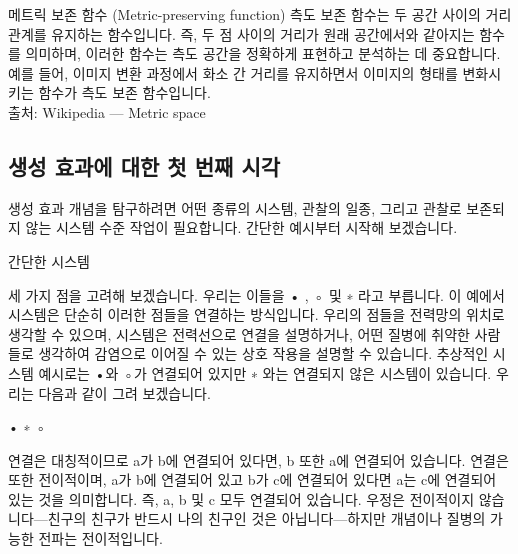 \documentclass[11pt, a4paper, twoside, openany]{book}
\begin{document}
\begin{deepresearch}{메트릭 보존 함수 (Metric-preserving function)}
측도 보존 함수는 두 공간 사이의 거리 관계를 유지하는 함수입니다.  즉, 두 점 사이의 거리가 원래 공간에서와 같아지는 함수를 의미하며, 이러한 함수는 측도 공간을 정확하게 표현하고 분석하는 데 중요합니다. 예를 들어, 이미지 변환 과정에서 화소 간 거리를 유지하면서 이미지의 형태를 변화시키는 함수가 측도 보존 함수입니다.
\\[4pt]{\footnotesize\color{ctgray} 출처: Wikipedia — Metric space}
\end{deepresearch}


\subsection{생성 효과에 대한 첫 번째 시각}
\label{sec:1-1-1}

생성 효과 개념을 탐구하려면 어떤 종류의 시스템, 관찰의 일종, 그리고 관찰로 보존되지 않는 시스템 수준 작업이 필요합니다. 간단한 예시부터 시작해 보겠습니다.

\par\medskip
간단한 시스템

\par\medskip
세 가지 점을 고려해 보겠습니다. 우리는 이들을 • , ◦ 및 ∗ 라고 부릅니다. 이 예에서 시스템은 단순히 이러한 점들을 연결하는 방식입니다. 우리의 점들을 전력망의 위치로 생각할 수 있으며, 시스템은 전력선으로 연결을 설명하거나, 어떤 질병에 취약한 사람들로 생각하여 감염으로 이어질 수 있는 상호 작용을 설명할 수 있습니다. 추상적인 시스템 예시로는 •와 ◦가 연결되어 있지만 ∗ 와는 연결되지 않은 시스템이 있습니다. 우리는 다음과 같이 그려 보겠습니다.

\par\medskip
•
∗
◦

\par\medskip
연결은 대칭적이므로 a\hspace{0pt}가 b\hspace{0pt}에 연결되어 있다면, b 또한 a\hspace{0pt}에 연결되어 있습니다. 연결은 또한 전이적이며, a\hspace{0pt}가 b\hspace{0pt}에 연결되어 있고 b\hspace{0pt}가 c\hspace{0pt}에 연결되어 있다면 a\hspace{0pt}는 c\hspace{0pt}에 연결되어 있는 것을 의미합니다. 즉, a, b 및 c 모두 연결되어 있습니다. 우정은 전이적이지 않습니다—친구의 친구가 반드시 나의 친구인 것은 아닙니다—하지만 개념이나 질병의 가능한 전파는 전이적입니다.
\end{document}

